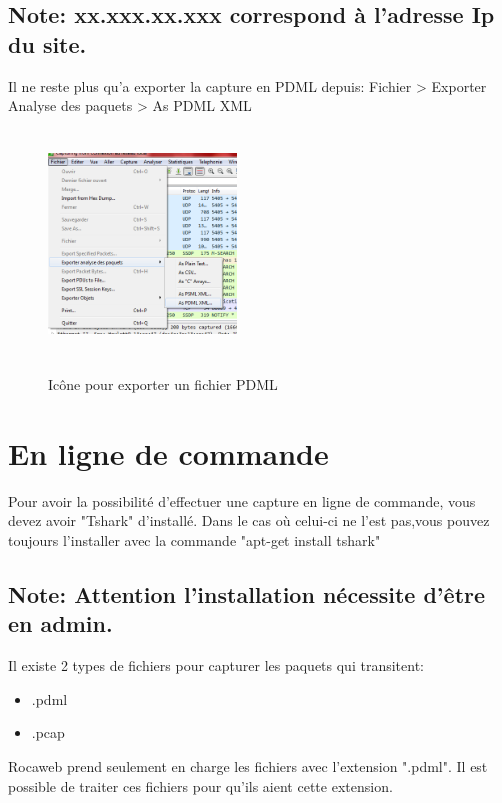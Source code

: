 \documentclass[a4paper,10pt,justified,openany]{tufte-book}
\begin{document}
\subsection{Note: xx.xxx.xx.xxx correspond à l'adresse Ip du site.}

Il ne reste plus qu'a exporter la capture en PDML depuis: \smallbreak
 Fichier > Exporter Analyse des paquets > As PDML XML
 
 \begin{figure}

\includegraphics[width=5cm, height=6cm]{./images/exportpdml.png}
\label{iconevueapprentissage}
\caption{Icône pour exporter un fichier PDML}
\end{figure}
\newpage
\section{En ligne de commande}

Pour avoir la possibilité d'effectuer une capture en ligne de commande, vous devez avoir "Tshark" d'installé. \smallbreak
Dans le cas où celui-ci ne l'est pas,vous pouvez toujours l'installer avec la commande "apt-get install tshark"

\subsection{Note: Attention l'installation nécessite d'être en admin.}


Il existe 2 types de fichiers pour capturer les paquets qui transitent:
\begin{itemize}
\item .pdml
\item .pcap
\end{itemize}

Rocaweb prend seulement en charge les fichiers avec l'extension ".pdml".\smallbreak
Il est possible de traiter ces fichiers pour qu'ils aient cette extension. 
 
\end{document}
